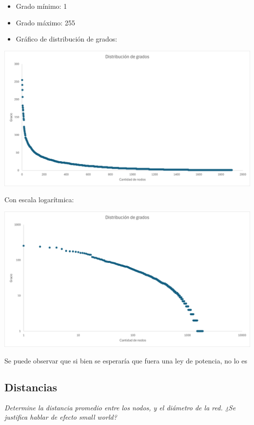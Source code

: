 \documentclass[12pt]{article}
\begin{document}
\begin{itemize}
    \item Grado mínimo: 1
    \item Grado máximo: 255
    \item Gráfico de distribución de grados: 
\end{itemize}
\begin{center}
    \includegraphics[scale=0.35]{images/distribucion_grados.png}
\end{center}
Con escala logarítmica:

\begin{center}
    \includegraphics[scale=0.35]{images/distribucion_grados_log_log.png}
\end{center}

Se puede observar que si bien se esperaría que fuera una ley de potencia, no lo es 
\subsection{Distancias} 
\textit{Determine la distancia promedio entre los nodos, y el diámetro de la red. ¿Se justifica hablar de efecto small world?}
\end{document}
